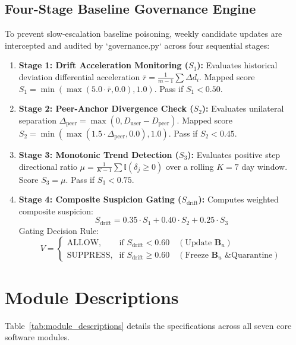 \documentclass[12pt,a4paper]{report}
\begin{document}
\subsection{Four-Stage Baseline Governance Engine}
To prevent slow-escalation baseline poisoning, weekly candidate updates are intercepted and audited by `governance.py` across four sequential stages:
\begin{enumerate}
    \item \textbf{Stage 1: Drift Acceleration Monitoring ($S_1$):} Evaluates historical deviation differential acceleration $\bar{r} = \frac{1}{m-1} \sum \Delta d_i$. Mapped score $S_1 = \min(\max(5.0 \cdot \bar{r}, 0.0), 1.0)$. Pass if $S_1 < 0.50$.
    \item \textbf{Stage 2: Peer-Anchor Divergence Check ($S_2$):} Evaluates unilateral separation $\Delta_{\text{peer}} = \max(0, D_{\text{user}} - D_{\text{peer}})$. Mapped score $S_2 = \min(\max(1.5 \cdot \Delta_{\text{peer}}, 0.0), 1.0)$. Pass if $S_2 < 0.45$.
    \item \textbf{Stage 3: Monotonic Trend Detection ($S_3$):} Evaluates positive step directional ratio $\mu = \frac{1}{K-1} \sum \mathbb{I}(\delta_j \ge 0)$ over a rolling $K=7$ day window. Score $S_3 = \mu$. Pass if $S_3 < 0.75$.
    \item \textbf{Stage 4: Composite Suspicion Gating ($S_{\text{drift}}$):} Computes weighted composite suspicion:
    \begin{equation}
        S_{\text{drift}} = 0.35 \cdot S_1 + 0.40 \cdot S_2 + 0.25 \cdot S_3
    \end{equation}
    Gating Decision Rule:
    \begin{equation}
        V = \begin{cases} \text{ALLOW}, & \text{if } S_{\text{drift}} < 0.60 \quad (\text{Update } \mathbf{B}_u) \\ \text{SUPPRESS}, & \text{if } S_{\text{drift}} \ge 0.60 \quad (\text{Freeze } \mathbf{B}_u \text{ \& Quarantine}) \end{cases}
    \end{equation}
\end{enumerate}

\section{Module Descriptions}
Table~\ref{tab:module_descriptions} details the specifications across all seven core software modules.
\end{document}
